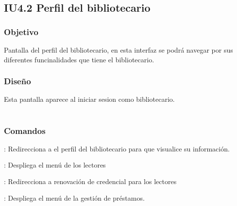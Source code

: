 \newpage
\subsection{IU4.2 Perfil del bibliotecario}

\subsubsection{Objetivo}
	Pantalla del perfil del bibliotecario, en esta interfaz se podrá navegar por sus diferentes funcinalidades que tiene el bibliotecario.  

\subsubsection{Diseño}
	Esta pantalla aparece al iniciar sesion como bibliotecario.  \\\\



\subsubsection{Comandos}
	\begin{Citemize}
		\item {}: Redirecciona a el perfil del bibliotecario para que visualice su información. 
		\item {}: Despliega el menú de los lectores
		\item {}: Redirecciona a renovación de credencial para los lectores
		\item {}: Despliega el menú de la gestión de préstamos. 
	\end{Citemize}